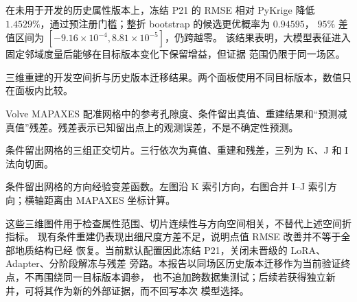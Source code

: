 在未用于开发的历史属性版本上，冻结 P21 的 RMSE 相对 PyKrige 降低
$1.4529\%$，通过预注册门槛；整折 bootstrap 的候选更优概率为 $0.94595$，
$95\%$ 差值区间为 $[-9.16\times10^{-4},8.81\times10^{-5}]$，仍跨越零。
该结果表明，大模型表征进入固定邻域度量后能够在目标版本变化下保留增益，但证据
范围仍限于同一场区。

  {三维重建的开发空间折与历史版本迁移结果。两个面板使用不同目标版本，数值只在面板内比较。}

  {Volve MAPAXES 配准网格中的参考孔隙度、条件留出真值、重建结果和“预测减真值”残差。残差表示已知留出点上的观测误差，不是不确定性预测。}

  {条件留出网格的三组正交切片。三行依次为真值、重建和残差，三列为 K、J 和 I 法向切面。}

  {条件留出网格的方向经验变差函数。左图沿 K 索引方向，右图合并 I--J 索引方向；横轴距离由 MAPAXES 坐标计算。}

这些三维图件用于检查属性范围、切片连续性与方向空间相关，不替代上述空间折指标。
现有条件重建仍表现出细尺度方差不足，说明点值 RMSE 改善并不等于全部地质结构已经
恢复。当前默认配置因此冻结 P21，关闭未晋级的 LoRA、Adapter、分阶段解冻与残差
旁路。本报告以同场区历史版本迁移作为当前验证终点，不再围绕同一目标版本调参，
也不追加跨数据集测试；后续若获得独立新井，可将其作为新的外部证据，而不回写本次
模型选择。

\FloatBarrier
